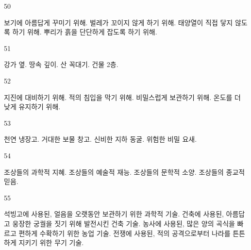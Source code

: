 \documentclass[fs9,seriesFre]{korfarm-base}
\begin{document}
\begin{kfSentenceUnit}{50}{}
\begin{kfChoices}
\kfChoice 보기에 아름답게 꾸미기 위해.
\kfChoice 벌레가 꼬이지 않게 하기 위해.
\kfChoice 태양열이 직접 닿지 않도록 하기 위해.
\kfChoice 뿌리가 흙을 단단하게 잡도록 하기 위해.
\end{kfChoices}
\end{kfSentenceUnit}

\begin{kfSentenceUnit}{51}{}
\begin{kfChoices}
\kfChoice 강가 옆.
\kfChoice 땅속 깊이.
\kfChoice 산 꼭대기.
\kfChoice 건물 2층.
\end{kfChoices}
\end{kfSentenceUnit}

\begin{kfSentenceUnit}{52}{}
\begin{kfChoices}
\kfChoice 지진에 대비하기 위해.
\kfChoice 적의 침입을 막기 위해.
\kfChoice 비밀스럽게 보관하기 위해.
\kfChoice 온도를 더 낮게 유지하기 위해.
\end{kfChoices}
\end{kfSentenceUnit}

\begin{kfSentenceUnit}{53}{}
\begin{kfChoices}
\kfChoice 천연 냉장고.
\kfChoice 거대한 보물 창고.
\kfChoice 신비한 지하 동굴.
\kfChoice 위험한 비밀 요새.
\end{kfChoices}
\end{kfSentenceUnit}

\begin{kfSentenceUnit}{54}{}
\begin{kfChoices}
\kfChoice 조상들의 과학적 지혜.
\kfChoice 조상들의 예술적 재능.
\kfChoice 조상들의 문학적 소양.
\kfChoice 조상들의 종교적 믿음.
\end{kfChoices}
\end{kfSentenceUnit}

\begin{kfSentenceUnit}{55}{}
\begin{kfChoices}
\kfChoice 석빙고에 사용된, 얼음을 오랫동안 보관하기 위한 과학적 기술.
\kfChoice 건축에 사용된, 아름답고 웅장한 궁궐을 짓기 위해 발전시킨 건축 기술.
\kfChoice 농사에 사용된, 많은 양의 곡식을 빠르고 편하게 수확하기 위한 농업 기술.
\kfChoice 전쟁에 사용된, 적의 공격으로부터 나라를 튼튼하게 지키기 위한 무기 기술.
\end{kfChoices}
\end{kfSentenceUnit}
\end{document}
